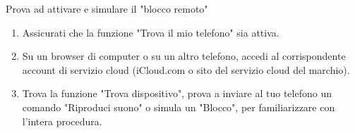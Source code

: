 \begin{tcbpractice}{Prova ad attivare e simulare il "blocco remoto"}
\begin{enumerate}
  \item Assicurati che la funzione "Trova il mio telefono" sia attiva.
  \item Su un browser di computer o su un altro telefono, accedi al corrispondente account di servizio cloud (iCloud.com o sito del servizio cloud del marchio).
  \item Trova la funzione "Trova dispositivo", prova a inviare al tuo telefono un comando "Riproduci suono" o simula un "Blocco", per familiarizzare con l'intera procedura.
\end{enumerate}

\end{tcbpractice}
